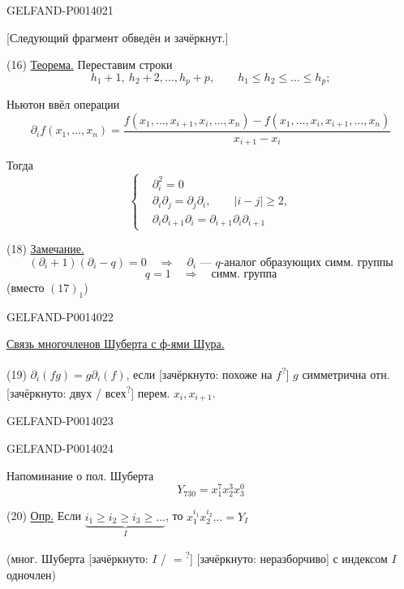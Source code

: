 \begin{GelfandAdjacentEvidence}{GELFAND-P001402}{1}

[Следующий фрагмент обведён и зачёркнут.]

(16) \uline{Теорема.} Переставим строки
\[
h_1+1,\ h_2+2,\ldots,h_p+p,\qquad h_1\le h_2\le\ldots\le h_p;
\]

Ньютон ввёл операции
\begin{equation*}
\partial_i f(x_1,\ldots,x_n)=
\frac{f(x_1,\ldots,x_{i+1},x_i,\ldots,x_n)
      -f(x_1,\ldots,x_i,x_{i+1},\ldots,x_n)}
     {x_{i+1}-x_i} \tag{16}
\end{equation*}

Тогда
\begin{equation*}
\left\{\begin{aligned}
&\partial_i^2=0\\
&\partial_i\partial_j=\partial_j\partial_i,\qquad \lvert i-j\rvert\ge2,\\
&\partial_i\partial_{i+1}\partial_i=\partial_{i+1}\partial_i\partial_{i+1}
\end{aligned}\right. \tag{17}
\end{equation*}

(18) \uline{Замечание.}
\[
(\partial_i+1)(\partial_i-q)=0
\quad\Rightarrow\quad \partial_i\text{ — \(q\)-аналог образующих симм. группы}
\]
\[
q=1\quad\Rightarrow\quad\text{симм. группа}
\]
(вместо \((17)_1\))
\end{GelfandAdjacentEvidence}
\begin{GelfandAdjacentEvidence}{GELFAND-P001402}{2}



\uline{Связь многочленов Шуберта с ф-ями Шура.}

(19) \(\partial_i(fg)=g\partial_i(f)\), если
[зачёркнуто: похоже на \(f\)\textsuperscript{?}]
\(g\) симметрична отн.
[зачёркнуто: двух / всех\textsuperscript{?}]
перем. \(x_i,x_{i+1}\).

\end{GelfandAdjacentEvidence}
\begin{GelfandAdjacentEvidence}{GELFAND-P001402}{3}

\end{GelfandAdjacentEvidence}
\begin{GelfandAdjacentEvidence}{GELFAND-P001402}{4}



Напоминание о пол. Шуберта
\[
Y_{730}=x_1^7x_2^3x_3^0
\]

(20) \uline{Опр.} Если \(\underbrace{i_1\ge i_2\ge i_3\ge\ldots}_{I}\),
то \(x_1^{i_1}x_2^{i_2}\ldots=Y_I\)

(мног. Шуберта
[зачёркнуто: \(I\) / \(=\)\textsuperscript{?}]
[зачёркнуто: неразборчиво]
с индексом \(I\) одночлен)

\end{GelfandAdjacentEvidence}
